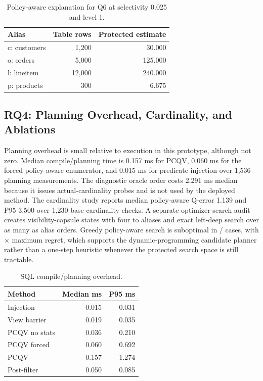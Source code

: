 \documentclass[conference]{IEEEtran}
\newcommand{\pcqv}{PCQV}
\begin{document}
\begin{table}[t]
\centering
\caption{Policy-aware explanation for Q6 at selectivity 0.025 and level 1.}
\label{tab:planexample}
\begin{tabular}{lrr}
\toprule
Alias & Table rows & Protected estimate \\
\midrule
c: customers & 1,200 & 30.000 \\
o: orders & 5,000 & 125.000 \\
l: lineitem & 12,000 & 240.000 \\
p: products & 300 & 6.675 \\
\bottomrule
\end{tabular}
\end{table}

\subsection{RQ4: Planning Overhead, Cardinality, and Ablations}
Planning overhead is small relative to execution in this prototype, although not zero. Median compile/planning time is 0.157 ms for \pcqv{}, 0.060 ms for the forced policy-aware enumerator, and 0.015 ms for predicate injection over 1,536 planning measurements. The diagnostic oracle order costs 2.291 ms median because it issues actual-cardinality probes and is not used by the deployed method. The cardinality study reports median policy-aware Q-error 1.139 and P95 3.500 over 1,230 base-cardinality checks. A separate optimizer-search audit creates \OptimizerSearchCases{} visibility-capsule states with four to \OptimizerSearchMaxAliases{} aliases and exact left-deep search over as many as \OptimizerSearchMaxOrders{} alias orders. Greedy policy-aware search is suboptimal in \OptimizerSearchSuboptimal{}/\OptimizerSearchCases{} cases, with \OptimizerSearchMaxRegret{}$\times$ maximum regret, which supports the dynamic-programming candidate planner rather than a one-step heuristic whenever the protected search space is still tractable.

\begin{table}[t]
\centering
\caption{SQL compile/planning overhead.}
\label{tab:planning}
\begin{tabular}{lrr}
\toprule
Method & Median ms & P95 ms \\
\midrule
Injection & 0.015 & 0.031 \\
View barrier & 0.019 & 0.035 \\
\pcqv{} no stats & 0.036 & 0.210 \\
\pcqv{} forced & 0.060 & 0.692 \\
\pcqv{} & 0.157 & 1.274 \\
Post-filter & 0.050 & 0.085 \\
\bottomrule
\end{tabular}
\end{table}
\end{document}
